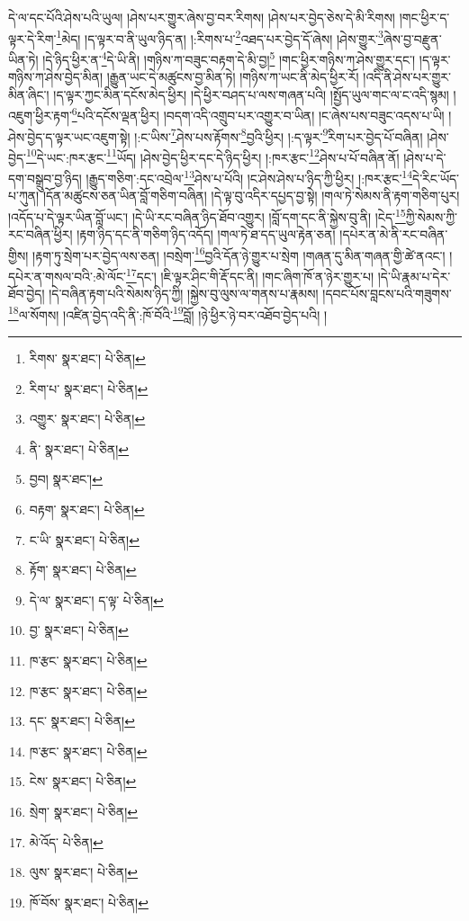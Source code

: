 དེ་ལ་དང་པོའི་ཤེས་པའི་ཡུལ། །ཤེས་པར་གྱུར་ཞེས་བྱ་བར་རིགས། །ཤེས་པར་བྱེད་ཅེས་དེ་མི་རིགས། །གང་ཕྱིར་ད་ལྟར་དེ་རིག་\footnote{རིགས་  སྣར་ཐང་།  པེ་ཅིན། }མེད། །ད་ལྟར་བ་ནི་ཡུལ་ཉིད་ན། །:རིགས་པ་\footnote{རིག་པ་  སྣར་ཐང་།  པེ་ཅིན། }འཐད་པར་བྱེད་དོ་ཞེས། །ཤེས་གྱུར་\footnote{འགྱུར་  སྣར་ཐང་།  པེ་ཅིན། }ཞེས་བྱ་བརྫུན་ཡིན་ཏེ། །དེ་ཉིད་ཕྱིར་ན་\footnote{ནི་  སྣར་ཐང་།  པེ་ཅིན། }དེ་ཡི་ནི། །གཉིས་ཀ་བཟུང་བརྟག་དེ་མི་བྱ།\footnote{བྱབ།  སྣར་ཐང་། } །གང་ཕྱིར་གཉིས་ཀ་ཤེས་གྱུར་དང་། །ད་ལྟར་གཉིས་ཀ་ཤེས་བྱེད་མིན། །རྒྱུན་ཡང་དེ་མཚུངས་བྱ་མིན་ཏེ། །གཉིས་ཀ་ཡང་ནི་མེད་ཕྱིར་རོ། །འདི་ནི་ཤེས་པར་གྱུར་མིན་ཞིང་། །ད་ལྟར་ཀྱང་མིན་དངོས་མེད་ཕྱིར། །དེ་ཕྱིར་བཤད་པ་ལས་གཞན་པའི། །སྤྱོད་ཡུལ་གང་ལ་ང་འདི་སྙམ། །འཇུག་ཕྱིར་རྟག་\footnote{བརྟག་  སྣར་ཐང་།  པེ་ཅིན། }པའི་དངོས་ལྡན་ཕྱིར། །བདག་འདི་འགྲུབ་པར་འགྱུར་བ་ཡིན། །ང་ཞེས་པས་བཟུང་འདས་པ་ཡི། །ཤེས་བྱེད་ད་ལྟར་ཡང་འཇུག་སྟེ། །:ང་ཡིས་\footnote{ང་ཡི་  སྣར་ཐང་།  པེ་ཅིན། }ཤེས་པས་རྟོགས་\footnote{རྟོག་  སྣར་ཐང་།  པེ་ཅིན། }བྱའི་ཕྱིར། །:ད་ལྟར་\footnote{དེ་ལ་  སྣར་ཐང་། ད་ལྟ་  པེ་ཅིན། }རིག་པར་བྱེད་པོ་བཞིན། །ཤེས་བྱེད་\footnote{བྱ་  སྣར་ཐང་།  པེ་ཅིན། }དེ་ཡང་:ཁར་རྩང་\footnote{ཁ་རྩང་  སྣར་ཐང་།  པེ་ཅིན། }ཡོད། །ཤེས་བྱེད་ཕྱིར་དང་དེ་ཉིད་ཕྱིར། །:ཁར་རྩང་\footnote{ཁ་རྩང་  སྣར་ཐང་།  པེ་ཅིན། }ཤེས་པ་པོ་བཞིན་ནོ། །ཤེས་པ་དེ་དག་བསྒྲུབ་བྱ་ཉིད། །རྒྱུད་གཅིག་:དང་འབྲེལ་\footnote{དང་  སྣར་ཐང་།  པེ་ཅིན། }ཤེས་པ་པོའི། །ང་ཤེས་ཤེས་པ་ཉིད་ཀྱི་ཕྱིར། །:ཁར་རྩང་\footnote{ཁ་རྩང་  སྣར་ཐང་།  པེ་ཅིན། }དེ་རིང་ཡོད་པ་ཀུན། །དོན་མཚུངས་ཅན་ཡིན་བློ་གཅིག་བཞིན། །དེ་ལྟ་བུ་འདིར་དཔྱད་བྱ་སྟེ། །གལ་ཏེ་སེམས་ནི་རྟག་གཅིག་པུར། །འདོད་པ་དེ་ལྟར་ཡིན་བློ་ཡང་། །དེ་ཡི་རང་བཞིན་ཉིད་ཐོབ་འགྱུར། །བློ་དག་དང་ནི་སྐྱེས་བུ་ནི། །ངེད་\footnote{ངེས་  སྣར་ཐང་།  པེ་ཅིན། }ཀྱི་སེམས་ཀྱི་རང་བཞིན་ཕྱིར། །རྟག་ཉིད་དང་ནི་གཅིག་ཉིད་འདོད། །གལ་ཏེ་ཐ་དད་ཡུལ་རྟེན་ཅན། །དཔེར་ན་མེ་ནི་རང་བཞིན་གྱིས། །རྟག་ཏུ་སྲེག་པར་བྱེད་ལས་ཅན། །བསྲེག་\footnote{སྲེག་  སྣར་ཐང་།  པེ་ཅིན། }བྱའི་དོན་ཉེ་གྱུར་པ་སྲེག །གཞན་དུ་མིན་གཞན་གྱི་ཚེ་ནའང་། །དཔེར་ན་གསལ་བའི་:མེ་ལོང་\footnote{མེ་འོད་  པེ་ཅིན། }དང་། །ཇི་ལྟར་ཤིང་གི་རྡོ་དང་ནི། །གང་ཞིག་ཁོ་ན་ཉེར་གྱུར་པ། །དེ་ཡི་རྣམ་པ་དེར་ཐོབ་བྱེད། །དེ་བཞིན་རྟག་པའི་སེམས་ཉིད་ཀྱི། །སྐྱེས་བུ་ལུས་ལ་གནས་པ་རྣམས། །དབང་པོས་བླངས་པའི་གཟུགས་\footnote{ལུས་  སྣར་ཐང་།  པེ་ཅིན། }ལ་སོགས། །འཛིན་བྱེད་འདི་ནི་:ཁོ་བོའི་\footnote{ཁོ་བོས་  སྣར་ཐང་།  པེ་ཅིན། }བློ། །ཉེ་ཕྱིར་ཉེ་བར་འཐོབ་བྱེད་པའི། །
